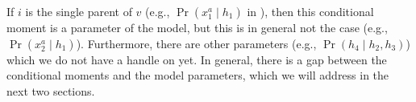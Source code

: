   If $i$ is the single parent of $v$ (e.g., $\Pr(x_1^a \mid h_1)$ in ),
  then this conditional moment is a parameter of the model,
  but this is in general not the case (e.g., $\Pr(x_2^a \mid h_1)$).
  Furthermore, there are other parameters (e.g., $\Pr(h_4 \mid h_2, h_3)$) which we do
  not have a handle on yet.
  In general, there is a gap between the conditional moments
  and the model parameters,
  which we will address in the next two sections.

